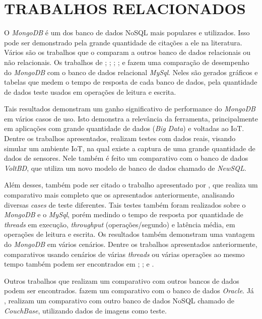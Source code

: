 \chapter{TRABALHOS RELACIONADOS}
\label{TrabalhosRelacionados}

O \textit{MongoDB} é um dos banco de dados NoSQL mais populares e utilizados. Isso pode ser demonstrado pela grande quantidade de citações a ele na literatura. Vários são os trabalhos que o comparam a outros banco de dados relacionais ou não relacionais. Os trabalhos de ; ; ; ; e  fazem uma comparação de desempenho do \textit{MongoDB} com o banco de dados relacional \textit{MySql}. Neles são gerados gráficos e tabelas que medem o tempo de resposta de cada banco de dados, pela quantidade de dados teste usados em operações de leitura e escrita.

Tais resultados demonstram um ganho significativo de performance do \textit{MongoDB} em vários casos de uso. Isto demonstra a relevância da ferramenta, principalmente em aplicações com grande quantidade de dados (\textit{Big Data}) e voltadas ao IoT. Dentre os trabalhos apresentados,  realizam testes com dados reais, visando simular um ambiente IoT, na qual existe a captura de uma grande quantidade de dados de sensores. Nele também é feito um comparativo com o banco de dados \textit{VoltBD}, que utiliza um novo modelo de banco de dados chamado de \textit{NewSQL}.

Além desses, também pode ser citado o trabalho apresentado por , que realiza um comparativo mais completo que os apresentados anteriormente, analisando diversas \textit{cases} de teste diferentes. Tais testes também foram realizados sobre o \textit{MongoDB} e o \textit{MySql}, porém medindo o tempo de resposta por quantidade de \textit{threads} em execução, \textit{throughput} (operações/segundo) e latência média, em operações de leitura e escrita. Os resultados também demonstram uma vantagem do \textit{MongoDB} em vários cenários. Dentre os trabalhos apresentados anteriormente, comparativos usando cenários de várias \textit{threads} ou várias operações ao mesmo tempo também podem ser encontrados em ; ; e .

Outros trabalhos que realizam um comparativo com outros bancos de dados podem ser encontrados.  fazem um comparativo com o banco de dados \textit{Oracle}. Já , realizam um comparativo com outro banco de dados NoSQL chamado de \textit{CouchBase}, utilizando dados de imagens como teste.

